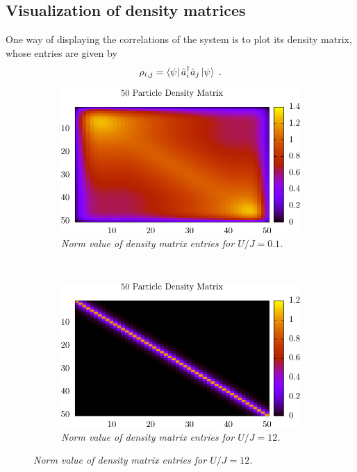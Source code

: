 \subsection{Visualization of density matrices}
One way of displaying the correlations of the system is to plot its density matrix, whose entries are given by
\begin{equation}
	\rho_{i,j} = \bra{\psi} \hat{a}_{i}^{\dag} \hat{a}_j \ket{\psi} \; .
\end{equation}
\begin{figure}[h!]
    \centering
    \begin{subfigure}[t]{0.49\textwidth}
        \includegraphics[width=\textwidth]{Figures/DensityMatSF.pdf}
        \caption{\textit{Norm value of density matrix entries for $U/J = 0.1$.}}
        \label{fig:DensityMatSF}
    \end{subfigure}
    ~
    \begin{subfigure}[t]{0.49\textwidth}
        \includegraphics[width=\textwidth]{Figures/DensityMatMI.pdf}
        \caption{\textit{Norm value of density matrix entries for $U/J = 12$.}}
        \label{fig:DensityMatMI}
    \end{subfigure}    
\end{figure}
